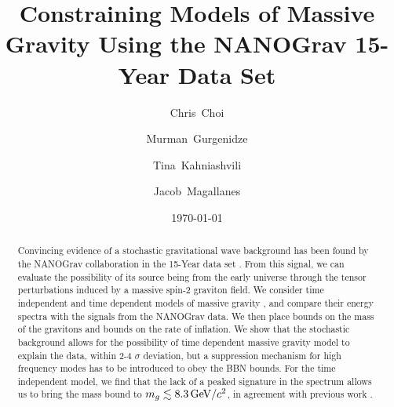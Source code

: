\documentclass[prd,twocolumn,aps,psfig,nofootinbib,nobibnotes,superscriptaddress,preprintnumbers,times]{revtex4-2}
\newcommand{\GeV}{\,{\rm GeV}}
\begin{document}
\title{Constraining Models of Massive Gravity Using the NANOGrav 15-Year Data Set}

\date{\today}
\author{Chris~Choi}

\author{Murman~Gurgenidze}

\author{Tina~Kahniashvili}

\author{Jacob~Magallanes}

\begin{abstract}
Convincing evidence of a stochastic gravitational wave background has been found by the NANOGrav collaboration in the 15-Year data set \cite{Agazie:2023}. From this signal, we can evaluate the possibility of its source being from the early universe through the tensor perturbations induced by a massive spin-2 graviton field. We consider time independent and time dependent models of massive gravity \cite{Fujita:2018,Gumrukcuoglu:2012}, and compare their energy spectra with the signals from the NANOGrav data. We then place bounds on the mass of the gravitons and bounds on the rate of inflation. We show that the stochastic background allows for the possibility of time dependent massive gravity model to explain the data, within 2-4 $\sigma$ deviation, but a suppression mechanism for high frequency modes has to be introduced to obey the BBN bounds. For the time independent model, we find that the lack of a peaked signature in the spectrum allows us to bring the mass bound to $m_g \lesssim 8.3 \GeV/c^2$, in agreement with previous work \cite{deRham:2017,Wang:2023, Wu:2023}.
\end{abstract}

\maketitle
\end{document}
